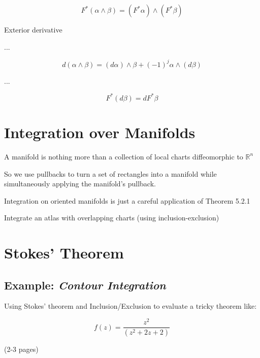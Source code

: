 \begin{equation}
F^* (\alpha \wedge \beta ) = (F^* \alpha) \wedge (F^* \beta)
\end{equation}

\begin{definition}
Exterior derivative
\end{definition}

...

\begin{equation}
d(\alpha \wedge \beta) = (d \alpha) \wedge \beta + (-1)^j \alpha \wedge ( d \beta)
\end{equation}

...

\begin{equation}
F^* (d \beta ) = dF^* \beta
\end{equation}



%
%
\section{Integration over Manifolds}

A manifold is nothing more than a collection of local charts diffeomorphic to $\mathbb{R}^n$

So we use pullbacks to turn a set of rectangles into a manifold while simultaneously applying the manifold's pullback.

Integration on oriented manifolds is just a careful application of Theorem 5.2.1

\begin{example}
Integrate an atlas with overlapping charts (using inclusion-exclusion)
\end{example}



%
%
\section{Stokes' Theorem}


\subsection{Example: \emph{Contour Integration}}

Using Stokes' theorem and Inclusion/Exclusion to evaluate a tricky theorem like:

\begin{equation}
f(z) = \frac{z^2}{(z^2 + 2z + 2)}
\end{equation}


 (2-3 pages)

\newpage
